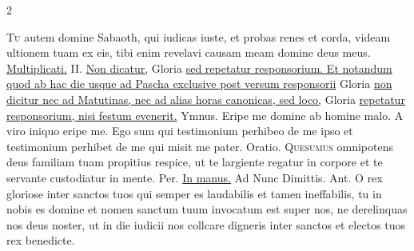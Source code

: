 \begin{multicols*}{2}
\par {}
\lettrine[lines=2]{\zallmancaps \color{Red} T}{u} \hypertarget{tu-autem-capitulum}{\label{tu-autem-capitulum}} autem domine Sabaoth, qui iudicas iuste, et probas renes et corda, videam ultionem tuam ex eis, tibi enim revelavi causam meam domine deus meus. \R \hyperlink{multiplicati-sunt}{Multiplicati.} {\color{Red} II.}
\newline \ul{Non dicatur,} Gloria \ul{sed repetatur responsorium. Et notandum quod ab hac die usque ad Pascha exclusive post versum responsorii} Gloria \ul{non dicitur nec ad Matutinas, nec ad alias horas canonicas, sed loco,} Gloria \ul{repetatur responsorium, nisi festum evenerit.} {\color{Red} Ymnus.}
\newline \V Eripe me domine ab homine malo.
\newline \R A viro iniquo eripe me.
 Ego sum qui testimonium perhibeo de me ipso et testimonium perhibet de me qui misit me pater. {\color{Red} Oratio.}
\lettrine[lines=2]{\zallmancaps \color{Red} Q}{uesumus} omnipotens deus familiam tuam propitius respice, ut te largiente regatur in corpore et te servante custodiatur in mente. Per.
 \R \hyperlink{in-manus-tuas-breve}{In manus.} {\color{Red} Ad Nunc Dimittis. Ant.} O rex gloriose inter sanctos tuos qui semper es laudabilis et tamen ineffabilis, tu in nobis es domine et nomen sanctum tuum invocatum est super nos, ne derelinquas nos deus noster, ut in die iudicii nos collcare digneris inter sanctos et electos tuos rex benedicte.

\end{multicols*}
